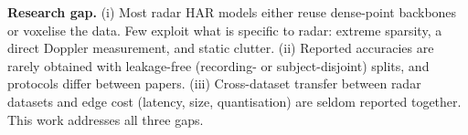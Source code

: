 \textbf{Research gap.} (i) Most radar HAR models either reuse dense-point
backbones or voxelise the data. Few exploit what is specific to radar: extreme
sparsity, a direct Doppler measurement, and static clutter. (ii) Reported
accuracies are rarely obtained with leakage-free (recording- or subject-disjoint)
splits, and protocols differ between papers. (iii) Cross-dataset transfer
between radar datasets and edge cost (latency, size, quantisation) are seldom
reported together. This work addresses all three gaps.
